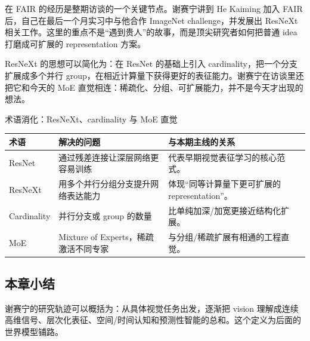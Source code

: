 在 FAIR 的经历是整期访谈的一个关键节点。谢赛宁讲到 He Kaiming 加入 FAIR 后，自己在最后一个月实习中与他合作 ImageNet challenge，并发展出 ResNeXt 相关工作。这里的重点不是“遇到贵人”的故事，而是顶尖研究者如何把普通 idea 打磨成可扩展的 representation 方案。

ResNeXt 的思想可以简化为：在 ResNet 的基础上引入 cardinality，把一个分支扩展成多个并行 group，在相近计算量下获得更好的表征能力。谢赛宁在访谈里还把它和今天的 MoE 直觉相连：稀疏化、分组、可扩展能力，并不是今天才出现的想法。

\begin{knowledgebox}{术语消化：ResNeXt、cardinality 与 MoE 直觉}
\begin{tabularx}{\textwidth}{p{}p{}X}
\toprule
术语 & 解决的问题 & 与本期主线的关系 \\
\midrule
ResNet & 通过残差连接让深层网络更容易训练 & 代表早期视觉表征学习的核心范式。 \\
ResNeXt & 用多个并行分组分支提升网络表达能力 & 体现“同等计算量下更可扩展的 representation”。 \\
Cardinality & 并行分支或 group 的数量 & 比单纯加深/加宽更接近结构化扩展。 \\
MoE & Mixture of Experts，稀疏激活不同专家 & 与分组/稀疏扩展有相通的工程直觉。 \\
\bottomrule
\end{tabularx}
\end{knowledgebox}

\subsection{本章小结}

谢赛宁的研究轨迹可以概括为：从具体视觉任务出发，逐渐把 vision 理解成连续高维信号、层次化表征、空间/时间认知和预测性智能的总和。这个定义为后面的世界模型铺路。

